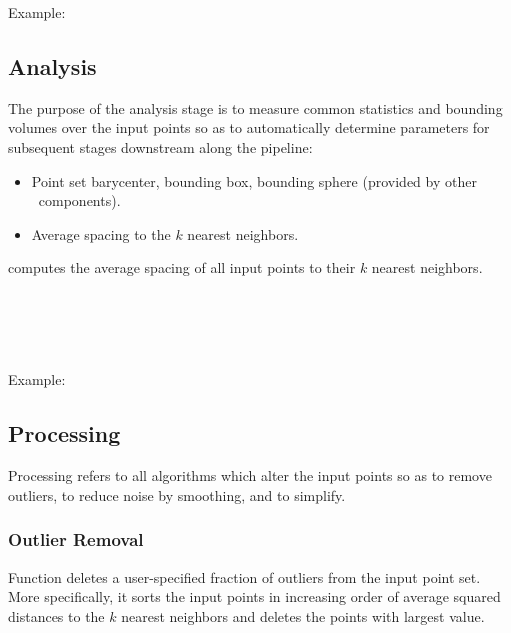 Example:



\subsection{Analysis}

The purpose of the analysis stage is to measure common statistics and bounding volumes over the input points so as to automatically determine parameters for subsequent stages downstream along the pipeline:
\begin{itemize}
  \item Point set barycenter, bounding box,
        bounding sphere (provided by other \cgal\ components).
  \item Average spacing to the $k$ nearest neighbors.
\end{itemize}

 computes the average spacing of all input points to their $k$ nearest neighbors.

  \\
  \\
  \\
  \\

Example:



\subsection{Processing}

Processing refers to all algorithms which alter the input points so as to remove outliers, to reduce noise by smoothing, and to simplify.

\subsubsection{Outlier Removal}

Function  deletes a user-specified fraction of outliers from the input point set. More specifically, it sorts the input points in increasing order of average squared distances to the $k$ nearest neighbors and deletes the points with largest value.

